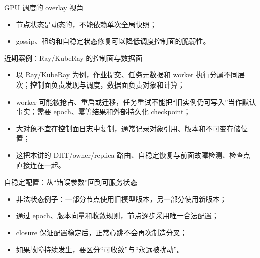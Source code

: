 \documentclass[UTF8,fontset=none,aspectratio=169,10pt]{beamer}
\begin{document}
\begin{frame}{GPU 调度的 overlay 视角}
\begin{center}
\end{center}
\begin{itemize}
  \item 节点状态是动态的，不能依赖单次全局快照；
  \item gossip、租约和自稳定状态修复可以降低调度控制面的脆弱性。
\end{itemize}
\end{frame}

\begin{frame}{近期案例：Ray/KubeRay 的控制面与数据面}
\begin{itemize}
  \item 以 Ray/KubeRay 为例，作业提交、任务元数据和 worker 执行分属不同层次；控制面负责发现与调度，数据面负责对象和计算；
  \item worker 可能被抢占、重启或迁移，任务重试不能把“旧实例仍可写入”当作默认事实；需要 epoch、幂等结果和外部持久化 checkpoint；
  \item 大对象不宜在控制面日志中复制，通常记录对象引用、版本和不可变存储位置；
  \item 这把本讲的 DHT/owner/replica 路由、自稳定恢复与前面故障检测、检查点直接连在一起。
\end{itemize}
\vfill
{}
\end{frame}

\begin{frame}{自稳定配置：从“错误参数”回到可服务状态}
\begin{itemize}
  \item 非法状态例子：一部分节点使用旧模型版本，另一部分使用新版本；
  \item 通过 epoch、版本向量和收敛规则，节点逐步采用唯一合法配置；
  \item closure 保证配置稳定后，正常心跳不会再次制造分叉；
  \item 如果故障持续发生，要区分“可收敛”与“永远被扰动”。
\end{itemize}
\end{frame}
\end{document}
